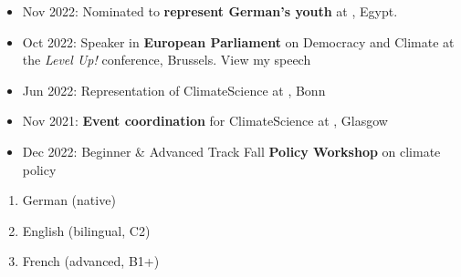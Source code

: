 \documentclass[11pt,a4paper,ragged2e,withhyper]{altacv}
\begin{document}
\begin{paracol}{2}

\medskip

\begin{itemize}
    \item Nov 2022: Nominated to \textbf{represent German's youth} at , Egypt.
    \item Oct 2022: Speaker in \textbf{European Parliament} on Democracy and Climate at the \emph{Level Up!} conference, Brussels. View my speech 
    \item Jun 2022: Representation of ClimateScience at , Bonn
    \item Nov 2021: \textbf{Event coordination} for ClimateScience at , Glasgow
\end{itemize}

\medskip

\begin{itemize}
    \item Dec 2022: Beginner \& Advanced Track   Fall \textbf{Policy Workshop} on climate policy
\end{itemize}

\medskip


\begin{enumerate}
    \item German (native)
    \item English (bilingual, C2)
    \item French (advanced, B1+)
\end{enumerate}


\end{paracol}
\end{document}
